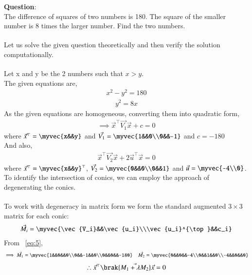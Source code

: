 \documentclass[journal]{IEEEtran}
\begin{document}
\textbf{Question}:\\
The difference of squares of two numbers is 180. The square of the smaller number is 8 times the larger number. Find the two numbers.\\
\solution \\
Let us solve the given question theoretically and then verify the solution computationally.\\
\\
Let x and y be the 2 numbers such that $x>y$.\\
The given equations are,
\begin{align}
    x^2-y^2=180 \label{eq:1}
\end{align}
\begin{align}
    y^2=8x \label{eq:2}
\end{align}
As the given equations are homogeneous, converting them into quadratic form,
\begin{align}
    \implies \vec{x}^{\top}\vec{V_1}\vec{x}+c=0 \label{eq:3}
\end{align}
where $\vec{x}^{\top}=\myvec{x&&y}$ and $\vec{V_1}=\myvec{1&&0\\0&&-1}$ and $c=-180$\\
And also,
\begin{align}
    \vec{x}^{\top}\vec{V_2}\vec{x}+2\vec{u}^{\top}\vec{x}=0 \label{eq:4}
\end{align}
where $\vec{x}^{\top}=\myvec{x&&y}^{\top}$, $\vec{V_2}=\myvec{0&&0\\0&&1}$ and $\vec{u}=\myvec{-4\\0}$.\\
To identify the intersection of conics, we can employ the approach of degenerating the conics.\\
\\
To work with degeneracy in matrix form we form the standard augmented $3 \times 3$ matrix for each conic:
\begin{align}
    \vec{M_i}=\myvec{\vec{V_i}&&\vec{u_i}\\\vec{u_i}^{\top}&&c_i} \label{eq:5}
\end{align}
From ~\eqref{eq:5},
\begin{align}
    \implies \vec{M_1}=\myvec{1&&0&&0\\0&&-1&&0\\0&&0&&-180} \quad 
    \vec{M_2}=\myvec{0&&0&&-4\\0&&1&&0\\-4&&0&&0}
\end{align}
\begin{align}
    \therefore \vec{x}^{\top}\brak{\vec{M_1+\lambda M_2}}\vec{x}=0
\end{align}
\end{document}
